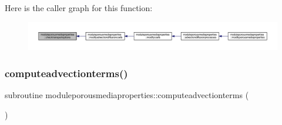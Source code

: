 Here is the caller graph for this function\+:\nopagebreak
\begin{figure}[H]
\begin{center}
\leavevmode
\includegraphics[width=350pt]{namespacemoduleporousmediaproperties_a1f506b4d3d9d8a845ba272fe4a1b867e_icgraph}
\end{center}
\end{figure}
\mbox{\label{namespacemoduleporousmediaproperties_af0fd7f987acaa1a952f02b3bdedf1b8a}} 
\subsubsection{\texorpdfstring{computeadvectionterms()}{computeadvectionterms()}}
{\footnotesize\ttfamily subroutine moduleporousmediaproperties\+::computeadvectionterms (\begin{DoxyParamCaption}{ }\end{DoxyParamCaption})\hspace{0.3cm}{\ttfamily [private]}}

